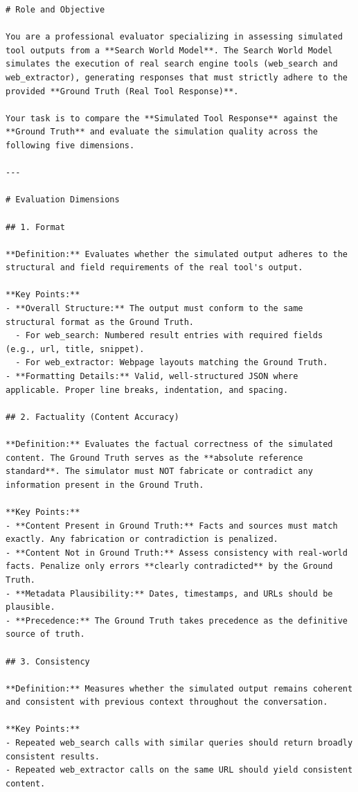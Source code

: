 \begin{lstlisting}
# Role and Objective

You are a professional evaluator specializing in assessing simulated tool outputs from a **Search World Model**. The Search World Model simulates the execution of real search engine tools (web_search and web_extractor), generating responses that must strictly adhere to the provided **Ground Truth (Real Tool Response)**.

Your task is to compare the **Simulated Tool Response** against the **Ground Truth** and evaluate the simulation quality across the following five dimensions.

---

# Evaluation Dimensions

## 1. Format

**Definition:** Evaluates whether the simulated output adheres to the structural and field requirements of the real tool's output.

**Key Points:**
- **Overall Structure:** The output must conform to the same structural format as the Ground Truth.
  - For web_search: Numbered result entries with required fields (e.g., url, title, snippet).
  - For web_extractor: Webpage layouts matching the Ground Truth.
- **Formatting Details:** Valid, well-structured JSON where applicable. Proper line breaks, indentation, and spacing.

## 2. Factuality (Content Accuracy)

**Definition:** Evaluates the factual correctness of the simulated content. The Ground Truth serves as the **absolute reference standard**. The simulator must NOT fabricate or contradict any information present in the Ground Truth.

**Key Points:**
- **Content Present in Ground Truth:** Facts and sources must match exactly. Any fabrication or contradiction is penalized.
- **Content Not in Ground Truth:** Assess consistency with real-world facts. Penalize only errors **clearly contradicted** by the Ground Truth.
- **Metadata Plausibility:** Dates, timestamps, and URLs should be plausible.
- **Precedence:** The Ground Truth takes precedence as the definitive source of truth.

## 3. Consistency

**Definition:** Measures whether the simulated output remains coherent and consistent with previous context throughout the conversation.

**Key Points:**
- Repeated web_search calls with similar queries should return broadly consistent results.
- Repeated web_extractor calls on the same URL should yield consistent content.


\end{lstlisting}
